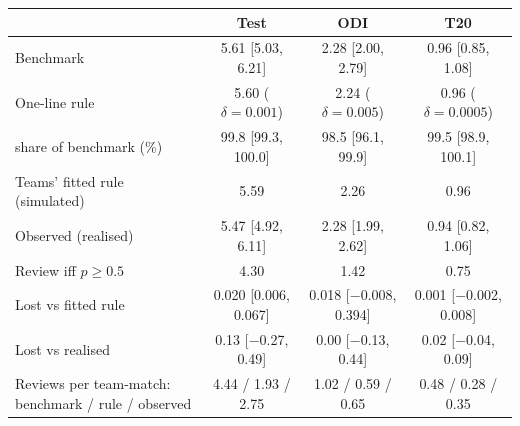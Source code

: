 \begin{tabular}{lccc}
\toprule
 & Test & ODI & T20 \\
\midrule
Benchmark & 5.61 [5.03, 6.21] & 2.28 [2.00, 2.79] & 0.96 [0.85, 1.08] \\
One-line rule & 5.60 ($\delta=0.001$) & 2.24 ($\delta=0.005$) & 0.96 ($\delta=0.0005$) \\
\quad share of benchmark (\%) & 99.8 [99.3, 100.0] & 98.5 [96.1, 99.9] & 99.5 [98.9, 100.1] \\
Teams' fitted rule (simulated) & 5.59 & 2.26 & 0.96 \\
Observed (realised) & 5.47 [4.92, 6.11] & 2.28 [1.99, 2.62] & 0.94 [0.82, 1.06] \\
Review iff $p\ge0.5$ & 4.30 & 1.42 & 0.75 \\
Lost vs fitted rule & 0.020 [0.006, 0.067] & 0.018 [\ensuremath{-}0.008, 0.394] & 0.001 [\ensuremath{-}0.002, 0.008] \\
Lost vs realised & 0.13 [\ensuremath{-}0.27, 0.49] & 0.00 [\ensuremath{-}0.13, 0.44] & 0.02 [\ensuremath{-}0.04, 0.09] \\
Reviews per team-match: benchmark / rule / observed & 4.44 / 1.93 / 2.75 & 1.02 / 0.59 / 0.65 & 0.48 / 0.28 / 0.35 \\
\bottomrule
\end{tabular}

